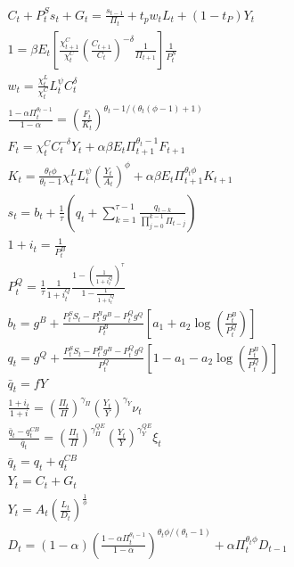 \documentclass[12pt]{article}
\begin{document}
\begingroup
\allowdisplaybreaks
\begin{align*}
& C_{t}+P_{t}^{S} s_{t}+G_{t}=\frac{s_{t-1}}{\Pi_{t}}+t_{p} w_{t} L_{t}+\left(1-t_{P}\right) Y_{t} \\
& 1=\beta E_{t}\left[\frac{\chi_{t+1}^{C}}{\chi_{t}^{C}}\left(\frac{C_{t+1}}{C_{t}}\right)^{-\delta} \frac{1}{\Pi_{t+1}}\right] \frac{1}{P_{t}^{S}} \\
& w_{t}=\frac{\chi_{t}^{L}}{\chi_{t}^{C}} L_{t}^{\psi} C_{t}^{\delta} \\
& \frac{1-\alpha \Pi_{t}^{\theta_{t}-1}}{1-\alpha}=\left(\frac{F_{t}}{K_{t}}\right)^{\theta_{t}-1 /\left(\theta_{t}(\phi-1)+1\right)} \\
& F_{t}=\chi_{t}^{C} C_{t}^{-\delta} Y_{t}+\alpha \beta E_{t} \Pi_{t+1}^{\theta_{t}-1} F_{t+1} \\
& K_{t}=\frac{\theta_{t} \phi}{\theta_{t}-1} \chi_{t}^{L} L_{t}^{\psi}\left(\frac{Y_{t}}{A_{t}}\right)^{\phi}+\alpha \beta E_{t} \Pi_{t+1}^{\theta_{t} \phi} K_{t+1} \\
& s_{t}=b_{t}+\frac{1}{\tau}\left(q_{t}+\sum_{k=1}^{\tau-1} \frac{q_{t-k}}{\prod_{j=0}^{k-1} \Pi_{t-j}}\right) \\
& 1+i_{t}=\frac{1}{P_{t}^{B}}\\
& P_{t}^{Q}=\frac{1}{\tau} \frac{1}{1+i_{t}^{Q}} \frac{1-\left(\frac{1}{1+i_{t}^{Q}}\right)^{\tau}}{1-\frac{1}{1+i_{t}^{Q}}}\\
& b_{t}=g^{B}+\frac{P_{t}^{S} S_{t}-P_{t}^{B} g^{B}-P_{t}^{Q} g^{Q}}{P_{t}^{B}}\left[a_{1}+a_{2} \log \left(\frac{P_{t}^{B}}{P_{t}^{Q}}\right)\right]\\
& q_{t}=g^{Q}+\frac{P_{t}^{S} S_{t}-P_{t}^{B} g^{B}-P_{t}^{Q} g^{Q}}{P_{t}^{Q}}\left[1-a_{1}-a_{2} \log \left(\frac{P_{t}^{B}}{P_{t}^{Q}}\right)\right] \\
& \bar{q}_{t}=f Y \\
& \frac{1+i_{t}}{1+i}=\left(\frac{\Pi_{t}}{\Pi}\right)^{\gamma_{\Pi}}\left(\frac{Y_{t}}{Y}\right)^{\gamma_{Y}} \nu_{t} \\
& \frac{\bar{q}_{t}-q_{t}^{C B}}{\bar{q}_{t}}=\left(\frac{\Pi_{t}}{\Pi}\right)^{\gamma_{\Pi}^{Q E}}\left(\frac{Y_{t}}{Y}\right)^{\gamma_{Y}^{Q E}} \xi_{t} \\
& \bar{q}_{t}=q_{t}+q_{t}^{C B} \\
& Y_{t}=C_{t}+G_{t} \\
& Y_{t}=A_{t}\left(\frac{L_{t}}{D_{t}}\right)^{\frac{1}{\phi}} \\
& D_{t}=(1-\alpha)\left(\frac{1-\alpha \Pi_{t}^{\theta_{t}-1}}{1-\alpha}\right)^{\theta_{t} \phi /\left(\theta_{t}-1\right)}+\alpha \Pi_{t}^{\theta_{t} \phi} D_{t-1} \\

\end{align*}
\end{document}
